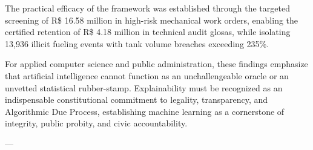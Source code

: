 \documentclass[10pt,a4paper,journal]{article}
\begin{document}
The practical efficacy of the framework was established through the targeted screening of R\$ 16.58 million in high-risk mechanical work orders, enabling the certified retention of R\$ 4.18 million in technical audit glosas, while isolating 13,936 illicit fueling events with tank volume breaches exceeding 235\%.

For applied computer science and public administration, these findings emphasize that artificial intelligence cannot function as an unchallengeable oracle or an unvetted statistical rubber-stamp. Explainability must be recognized as an indispensable constitutional commitment to legality, transparency, and Algorithmic Due Process, establishing machine learning as a cornerstone of integrity, public probity, and civic accountability.

---
\end{document}
